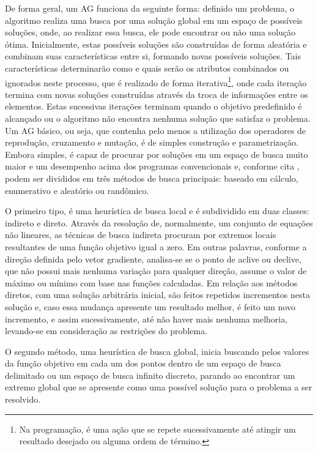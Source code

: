 De forma geral, um AG funciona da seguinte forma: definido um problema, o algoritmo realiza uma busca por uma solução global em um espaço de possíveis soluções, onde, ao realizar essa busca, ele pode encontrar ou não uma solução ótima. Inicialmente, estas possíveis soluções são construídas de forma aleatória e combinam suas características entre si, formando novas possíveis soluções. Tais características determinarão como e quais serão os atributos combinados ou ignorados neste processo, que é realizado de forma iterativa\footnote{Na programação, é uma ação que se repete sucessivamente até atingir um resultado desejado ou alguma ordem de término.}, onde cada iteração termina com novas soluções construídas através da troca de informações entre os elementos. Estas sucessivas iterações terminam quando o objetivo predefinido é alcançado ou o algoritmo não encontra nenhuma solução que satisfaz o problema. Um AG básico, ou seja, que contenha pelo menos a utilização dos operadores de reprodução, cruzamento e mutação, é de simples construção e parametrização. Embora simples, é capaz de procurar por soluções em um espaço de busca muito maior e um desempenho acima dos programas convencionais \citet[pg.66]{holland_genetic_1992} e, conforme cita \citet[pg.2]{goldberg_genetic_1989}, podem ser divididos em três métodos de busca principais: baseado em cálculo, enumerativo e aleatório ou randômico.

O primeiro tipo, é uma heurística de busca local e é subdividido em duas classes: indireto e direto. Através da resolução de, normalmente, um conjunto de equações não lineares, as técnicas de busca indireta procuram por extremos locais resultantes de uma função objetivo igual a zero. Em outras palavras, conforme a direção definida pelo vetor gradiente, analisa-se se o ponto de aclive ou declive, que não possui mais nenhuma variação para qualquer direção, assume o valor de máximo ou mínimo com base nas funções calculadas. Em relação aos métodos diretos, com uma solução arbitrária inicial, são feitos repetidos incrementos nesta solução e, caso essa mudança apresente um resultado melhor, é feito um novo incremento, e assim sucessivamente, até não haver mais nenhuma melhoria, levando-se em consideração as restrições do problema.

O segundo método, uma heurística de busca global, inicia buscando pelos valores da função objetivo em cada um dos pontos dentro de um espaço de busca delimitado ou um espaço de busca infinito discreto, parando ao encontrar um extremo global que se apresente como uma possível solução para o problema a ser resolvido. 

